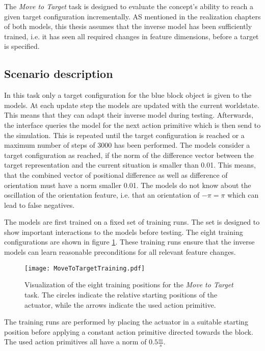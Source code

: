 The \textit{Move to Target} task is designed to evaluate the concept's ability to reach a given target configuration incrementally. AS mentioned in the 
realization chapters of both models, this thesis assumes that the inverse model has been sufficiently trained, i.e. it has seen all required changes in feature dimensions, before a target is specified. 

\subsection{Scenario description}

In this task only a target configuration for the blue block object is given to the models. At each update step the models are updated with the current worldstate.
This means that they can adapt their inverse model during testing.
Afterwards, the interface queries the model for the next action primitive which is then send to the simulation. This is repeated until the target configuration is reached or a maximum number of steps of 3000 has been performed.
The models consider a target configuration as reached, if the norm of the difference vector between the target representation and the current situation is smaller than 0.01. This means, that the combined vector of positional difference as well as difference of orientation must have a norm smaller 0.01. The models do not know about the oscillation of the orientation feature, i.e. that an orientation of $-\pi = \pi$ which can lead to false negatives.

The models are first trained on a fixed set of training runs. The set is designed to show important interactions to the models before testing. The eight training configurations are shown in figure \ref{fig:moveToTargetTraining}.
These training runs ensure that the inverse models can learn reasonable preconditions for all relevant feature changes.

\begin{figure}
\centering
\texttt{[image: MoveToTargetTraining.pdf]}
\caption{Visualization of the eight training positions for the \textit{Move to Target} task. The circles indicate the relative starting positions of the actuator, while the arrows indicate the used action primitive.}
\label{fig:moveToTargetTraining}
\end{figure}

The training runs are performed by placing the actuator in a suitable starting position before applying a constant action primitive directed towards the block.
The used action primitives all have a norm of $0.5\frac{m}{s}$.

